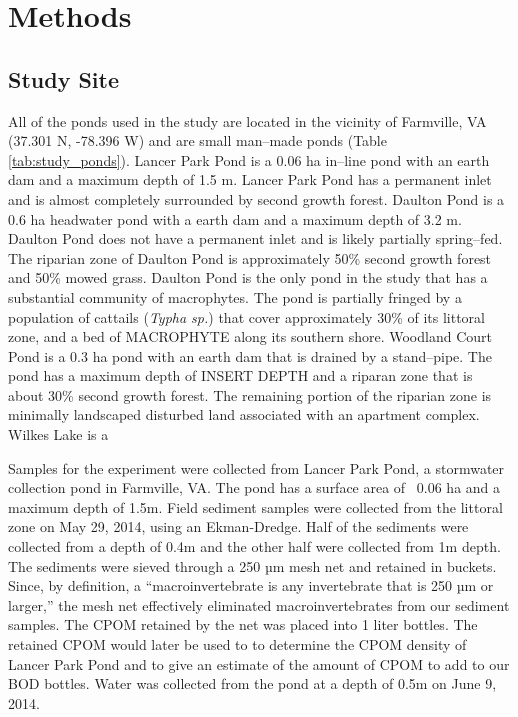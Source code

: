 \section{Methods}
\subsection{Study Site}
All of the ponds used in the study are located in the vicinity of Farmville, VA (37.301 N, -78.396 W) and are small man--made ponds (Table \ref{tab:study_ponds}).  Lancer Park Pond is a 0.06 ha in--line pond with an earth dam and a maximum depth of 1.5 m. Lancer Park Pond has a permanent inlet and is almost completely surrounded by second growth forest. Daulton Pond is a 0.6 ha headwater pond with a earth dam and a maximum depth of 3.2 m. Daulton Pond does not have a permanent inlet and is likely partially spring--fed. The riparian zone of Daulton Pond is approximately 50\% second growth forest and 50\% mowed grass. Daulton Pond is the only pond in the study that has a substantial community of macrophytes. The pond is partially fringed by a population of cattails (\emph{Typha sp.}) that cover approximately 30\% of its littoral zone, and a bed of MACROPHYTE along its southern shore. Woodland Court Pond is a 0.3 ha pond with an earth dam that is drained by a stand--pipe. The pond has a maximum depth of INSERT DEPTH and a riparan zone that is about 30\% second growth forest. The remaining portion of the riparian zone is minimally landscaped disturbed land associated with an apartment complex. Wilkes Lake is a 


Samples for the experiment were collected from Lancer Park Pond, a stormwater collection pond in Farmville, VA. The pond has a surface area of ~0.06 ha and a maximum depth of 1.5m. Field sediment samples were collected from the littoral zone on May 29, 2014, using an Ekman-Dredge. Half of the sediments were collected from a depth of 0.4m and the other half were collected from 1m depth. The sediments were sieved through a 250 µm mesh net and retained in buckets. Since, by definition, a “macroinvertebrate is any invertebrate that is 250 µm or larger,” the mesh net effectively eliminated macroinvertebrates from our sediment samples. The CPOM retained by the net was placed into 1 liter bottles. The retained CPOM would later be used to to determine the CPOM density of Lancer Park Pond and to give an estimate of the amount of CPOM to add to our BOD bottles. Water was collected from the pond at a depth of 0.5m on June 9, 2014.
    
